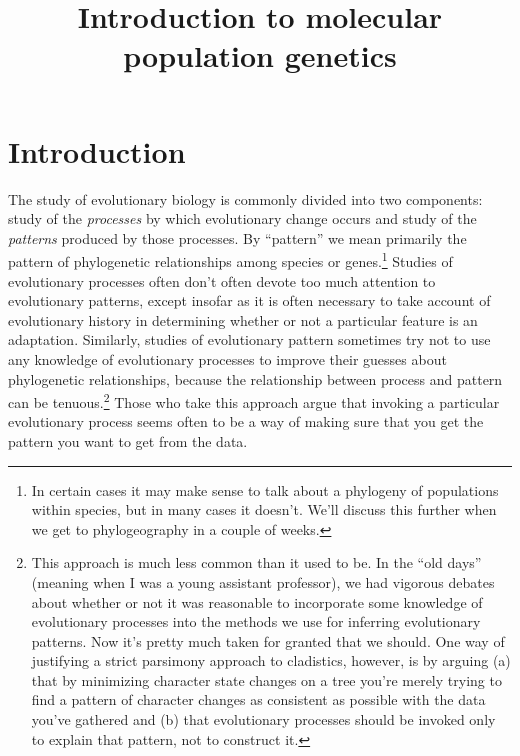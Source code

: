 \documentclass[12pt]{article}
\title{Introduction to molecular population genetics}
\begin{document}
\maketitle

\thispagestyle{first}

\section*{Introduction}

The study of evolutionary biology is commonly divided into two
components: study of the {\it processes\/} by which evolutionary
change occurs and study of the {\it patterns\/} produced by those
processes. By ``pattern'' we mean primarily the pattern of
phylogenetic relationships among species or genes.\footnote{In certain
  cases it may make sense to talk about a phylogeny of populations
  within species, but in many cases it doesn't. We'll discuss this
  further when we get to phylogeography in a couple of weeks.} Studies
of evolutionary processes often don't often devote too much attention
to evolutionary patterns, except insofar as it is often necessary to
take account of evolutionary history in determining whether or not a
particular feature is an adaptation. Similarly, studies of
evolutionary pattern sometimes try not to use any knowledge of
evolutionary processes to improve their guesses about phylogenetic
relationships, because the relationship between process and pattern
can be tenuous.\footnote{This approach is much less common than it
  used to be. In the ``old days'' (meaning when I was a young
  assistant professor), we had vigorous debates about whether or not
  it was reasonable to incorporate some knowledge of evolutionary
  processes into the methods we use for inferring evolutionary
  patterns. Now it's pretty much taken for granted that we should. One
  way of justifying a strict parsimony approach to cladistics,
  however, is by arguing (a) that by minimizing character state
  changes on a tree you're merely trying to find a pattern of
  character changes as consistent as possible with the data you've
  gathered and (b) that evolutionary processes should be invoked only
  to explain that pattern, not to construct it.} Those who take this
approach argue that invoking a particular evolutionary process seems
often to be a way of making sure that you get the pattern you want to
get from the data.
\end{document}
